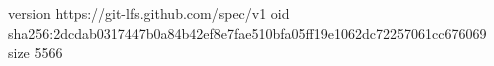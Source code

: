 version https://git-lfs.github.com/spec/v1
oid sha256:2dcdab0317447b0a84b42ef8e7fae510bfa05ff19e1062dc72257061cc676069
size 5566
